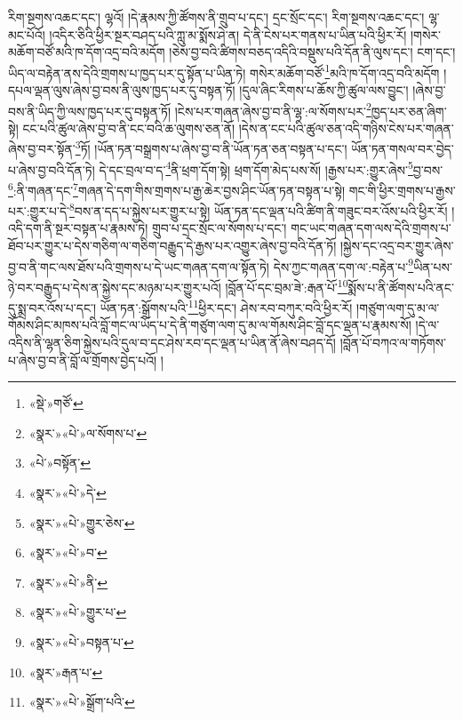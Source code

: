 རིག་སྔགས་འཆང་དང་། ལྷའོ། །དེ་རྣམས་ཀྱི་ཚོགས་ནི་གྲུབ་པ་དང་། དྲང་སྲོང་དང་། རིག་སྔགས་འཆང་དང་། ལྷ་མང་པོའོ། །འདིར་ཅིའི་ཕྱིར་སྔར་བཤད་པའི་ཀླུ་མ་སྨོས་ཤེ་ན། དེ་ནི་ངེས་པར་གནས་པ་ཡིན་པའི་ཕྱིར་རོ། །གསེར་མཆོག་བཙོ་མའི་ཁ་དོག་འདྲ་བའི་མདོག །ཅེས་བྱ་བའི་ཚིགས་བཅད་འདིའི་བསྡུས་པའི་དོན་ནི་ལུས་དང་། ངག་དང་། ཡིད་ལ་བརྟེན་ནས་དེའི་གྲགས་པ་ཁྱད་པར་དུ་སྟོན་པ་ཡིན་ཏེ། གསེར་མཆོག་བཙོ་\footnote{«སྡེ་»གཙོ་}མའི་ཁ་དོག་འདྲ་བའི་མདོག །དཔལ་ལྡན་ལུས་ཞེས་བྱ་བས་ནི་ལུས་ཁྱད་པར་དུ་བསྟན་ཏོ། །དུལ་ཞིང་རིགས་པ་ཆོས་ཀྱི་ཚུལ་ལས་བྱུང་། །ཞེས་བྱ་བས་ནི་ཡིད་ཀྱི་ལས་ཁྱད་པར་དུ་བསྟན་ཏོ། །ངེས་པར་གཞན་ཞེས་བྱ་བ་ནི་ལྷ་:ལ་སོགས་པར་\footnote{«སྣར་»«པེ་»ལ་སོགས་པ་}ཁྱད་པར་ཅན་ཞིག་སྟེ། ངང་པའི་ཚུལ་ཞེས་བྱ་བ་ནི་ངང་བའི་ཆ་ལུགས་ཅན་ནོ། །དེས་ན་ངང་པའི་ཚུལ་ཅན་འདི་གཉིས་ངེས་པར་གཞན་ཞེས་བྱ་བར་སྟོན་\footnote{«པེ་»བསྟོན་}ཏོ། །ཡོན་ཏན་བསྒྲགས་པ་ཞེས་བྱ་བ་ནི་ཡོན་ཏན་ཅན་བསྟན་པ་དང་། ཡོན་ཏན་གསལ་བར་བྱེད་པ་ཞེས་བྱ་བའི་དོན་ཏེ། དེ་དང་བྲལ་བ་ད་\footnote{«སྣར་»«པེ་»དེ་}ནི་ཕྲག་དོག་སྟེ། ཕྲག་དོག་མེད་པས་སོ། །རྒྱས་པར་:གྱུར་ཞེས་\footnote{«སྣར་»«པེ་»གྱུར་ཅེས་}བྱ་བས་\footnote{«སྣར་»«པེ་»བ་}:ནི་གཞན་དང་\footnote{«སྣར་»«པེ་»ནི་}གཞན་དེ་དག་གིས་གྲགས་པ་རྒྱ་ཆེར་བྱས་ཤིང་ཡོན་ཏན་བསྟན་པ་སྟེ། གང་གི་ཕྱིར་གྲགས་པ་རྒྱས་པར་:གྱུར་པ་དེ་\footnote{«སྣར་»«པེ་»གྱུར་པ་}བས་ན་དད་པ་སྐྱེས་པར་གྱུར་པ་སྟེ། ཡོན་ཏན་དང་ལྡན་པའི་ཚིག་ནི་གཟུང་བར་འོས་པའི་ཕྱིར་རོ། །འདི་དག་ནི་སྔར་བསྟན་པ་རྣམས་ཏེ། གྲུབ་པ་དྲང་སྲོང་ལ་སོགས་པ་དང་། གང་ཡང་གཞན་དག་ལས་དེའི་གྲགས་པ་ཐོབ་པར་གྱུར་པ་དེས་གཅིག་ལ་གཅིག་བརྒྱུད་དེ་རྒྱས་པར་འགྱུར་ཞེས་བྱ་བའི་དོན་ཏོ། །སྐྱེས་དང་འདྲ་བར་གྱུར་ཞེས་བྱ་བ་ནི་གང་ལས་ཐོས་པའི་གྲགས་པ་དེ་ཡང་གཞན་དག་ལ་སྟོན་ཏེ། དེས་ཀྱང་གཞན་དག་ལ་:བརྟེན་པ་\footnote{«སྣར་»«པེ་»བསྟན་པ་}ཡིན་པས་ཉེ་བར་བརྒྱུད་པ་དེས་ན་སྐྱེས་དང་མཉམ་པར་གྱུར་པའོ། །བློན་པོ་དང་བྲམ་ཟེ་:རྒན་པོ་\footnote{«སྣར་»རྒན་པ་}སྨོས་པ་ནི་ཚོགས་པའི་ནང་དུ་སྨྲ་བར་འོས་པ་དང་། ཡོན་ཏན་:སྒྲོགས་པའི་\footnote{«སྣར་»«པེ་»སྒྲོག་པའི་}ཕྱིར་དང་། ཤེས་རབ་བཀུར་བའི་ཕྱིར་རོ། །གཙུག་ལག་དུ་མ་ལ་གོམས་ཤིང་མཁས་པའི་བློ་གང་ལ་ཡོད་པ་དེ་ནི་གཙུག་ལག་དུ་མ་ལ་གོམས་ཤིང་བློ་དང་ལྡན་པ་རྣམས་སོ། །དེ་ལ་འདིས་ནི་ལྷན་ཅིག་སྐྱེས་པའི་དུལ་བ་དང་ཤེས་རབ་དང་ལྡན་པ་ཡིན་ནོ་ཞེས་བཤད་དོ། །བློན་པོ་བཀའ་ལ་གཏོགས་པ་ཞེས་བྱ་བ་ནི་བློ་ལ་གྲོགས་བྱེད་པའོ། །
